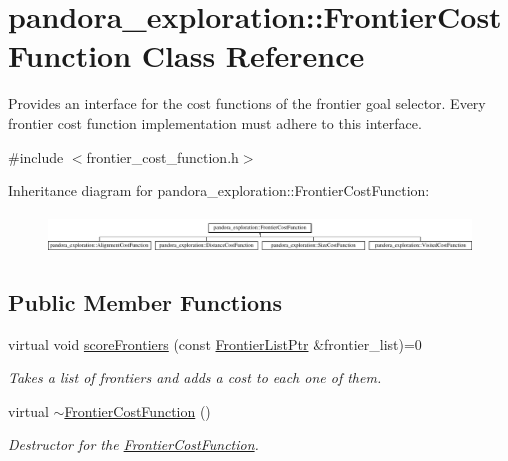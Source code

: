 \hypertarget{classpandora__exploration_1_1_frontier_cost_function}{\section{pandora\-\_\-exploration\-:\-:\-Frontier\-Cost\-Function \-Class \-Reference}
\label{classpandora__exploration_1_1_frontier_cost_function}
}


\-Provides an interface for the cost functions of the frontier goal selector. \-Every frontier cost function implementation must adhere to this interface.  




{\ttfamily \#include $<$frontier\-\_\-cost\-\_\-function.\-h$>$}

\-Inheritance diagram for pandora\-\_\-exploration\-:\-:\-Frontier\-Cost\-Function\-:\begin{figure}[H]
\begin{center}
\leavevmode
\includegraphics[height=1.033210cm]{classpandora__exploration_1_1_frontier_cost_function}
\end{center}
\end{figure}
\subsection*{\-Public \-Member \-Functions}
\begin{DoxyCompactItemize}
\item 
virtual void \hyperlink{classpandora__exploration_1_1_frontier_cost_function_a1049bc25e934365fdf3a1a6ab88c4cca}{score\-Frontiers} (const \hyperlink{namespacepandora__exploration_a6f3b1959fca391e2ef3ac46b6e96be7a}{\-Frontier\-List\-Ptr} \&frontier\-\_\-list)=0
\begin{DoxyCompactList}\small\item\em \-Takes a list of frontiers and adds a cost to each one of them. \end{DoxyCompactList}\item 
virtual \hyperlink{classpandora__exploration_1_1_frontier_cost_function_a9ef805895fb20c6409041addca739afa}{$\sim$\-Frontier\-Cost\-Function} ()
\begin{DoxyCompactList}\small\item\em \-Destructor for the \hyperlink{classpandora__exploration_1_1_frontier_cost_function}{\-Frontier\-Cost\-Function}. \end{DoxyCompactList}\end{DoxyCompactItemize}
